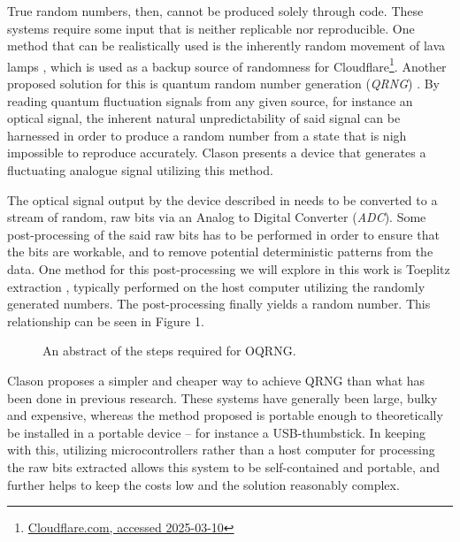 \documentclass{sigchi}
\begin{document}
True random numbers, then, cannot be produced solely through code. These systems require some input that is neither replicable nor reproducible. One method that can be realistically used is the inherently random movement of lava lamps \cite{lavarand}, which is used as a backup source of randomness for Cloudflare\footnote{\href{https://blog.cloudflare.com/randomness-101-lavarand-in-production/}{Cloudflare.com, accessed 2025-03-10}}. Another proposed solution for this is quantum random number generation (\emph{QRNG}) \cite{QRNG}. By reading quantum fluctuation signals from any given source, for instance an optical signal, the inherent natural unpredictability of said signal can be harnessed in order to produce a random number from a state that is nigh impossible to reproduce accurately. Clason \cite{Clason2023} presents a device that generates a fluctuating analogue signal utilizing this method.

The optical signal output by the device described in \cite{Clason2023} needs to be converted to a stream of random, raw bits via an Analog to Digital Converter (\emph{ADC}). Some post-processing of the said raw bits has to be performed in order to ensure that the bits are workable, and to remove potential deterministic patterns from the data. One method for this post-processing we will explore in this work is Toeplitz extraction \cite{toeplitz}, typically performed on the host computer utilizing the randomly generated numbers. The post-processing finally yields a random number. This relationship can be seen in Figure 1.

\begin{figure}[ht] \centering {} \caption{An abstract of the steps required for OQRNG.}
\label{fig:linear-system} \end{figure}

Clason proposes a simpler and cheaper way to achieve QRNG \cite{Clason2023} than what has been done in previous research. These systems have generally been large, bulky and expensive, whereas the method proposed is portable enough to theoretically be installed in a portable device -- for instance a USB-thumbstick. In keeping with this, utilizing microcontrollers rather than a host computer for processing the raw bits extracted allows this system to be self-contained and portable, and further helps to keep the costs low and the solution reasonably complex.
\end{document}
